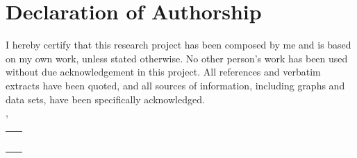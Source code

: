 \documentclass[
	11pt,			%
	a4paper,		%
	footsepline=false,	%
	automark,		%
	headings=normal,	%
	pointlessnumbers,	%
	openany,		%
	cleardoublepage=plain,	%
	abstracton,		%
	index=totoc,		%
	listof=totoc,		%
	bibliography=totoc,	%
]{scrreprt}
\begin{document}
\chapter*{Declaration of Authorship}
\thispagestyle{empty}

I hereby certify that this research project has been composed by me and is based on my own work, unless stated otherwise. No other person's work has been used without due acknowledgement in this project. All references and verbatim extracts have been quoted, and all sources of information, including graphs and data sets, have been specifically acknowledged. \\[2ex]
\dcplace, \dcdate\\[6ex]
\flushleft
\newlength\us
\settowidth{\us}{-\dcauthorfirstname~\dcauthorlastname-}
\begin{tabular}{p{\us}}\hline
	\centering\footnotesize \dcauthorfirstname~\dcauthorlastname
\end{tabular}
\end{document}
